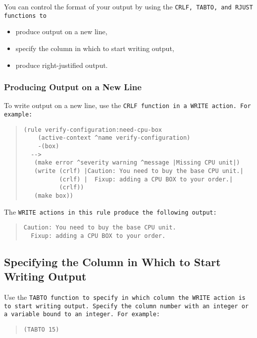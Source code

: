 You can control the format of your output by using the \tt{CRLF},
\tt{TABTO}, and \tt{RJUST} functions to

\begin{itemize}
\item produce output on a new line,
\item specify the column in which to start writing output,
\item produce right-justified output.
\end{itemize}

\subsubsection{Producing Output on a New Line}

To write output on a new line, use the \tt{CRLF} function in a
\tt{WRITE} action. For example:

\begin{quote}
\begin{verbatim}
(rule verify-configuration:need-cpu-box
    (active-context ^name verify-configuration)
    -(box)
  -->
   (make error ^severity warning ^message |Missing CPU unit|)
   (write (crlf) |Caution: You need to buy the base CPU unit.|
          (crlf) |  Fixup: adding a CPU BOX to your order.|
          (crlf))
   (make box))
\end{verbatim}
\end{quote}

The \tt{WRITE} actions in this rule produce the following output:

\begin{quote}
\begin{verbatim}
Caution: You need to buy the base CPU unit.
  Fixup: adding a CPU BOX to your order.
\end{verbatim}
\end{quote}

\subsection{Specifying the Column in Which to Start Writing Output}

Use the \tt{TABTO} function to specify in which column the \tt{WRITE}
action is to start writing output. Specify the column number with an
integer or a variable bound to an integer. For example:

\begin{quote}
\begin{verbatim}
(TABTO 15)
\end{verbatim}
\end{quote}

